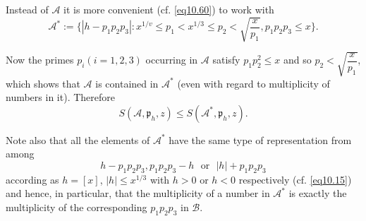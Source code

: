 Instead of $\mathscr{A}$ it is more convenient (cf. \eqref{eq10.60})
to work with 
\begin{equation*}
\mathscr{A}^* := \{ |h-p_1 p_2 p_3 |: x^{1/v} \leq p_1 < x^{1/3} \leq
p_2 < \sqrt{\frac{x}{p_1}}, p_1 p_2 p_3 \leq x
\}. \tag{10.32}\label{eq10.32} 
\end{equation*}

Now the primes $p_i (i = 1,2,3)$ occurring in $\mathscr{A}$ satisfy
$p_1 p^2_2 \leq x$ and so $p_2 < \sqrt{\dfrac{x}{p_1}}$, which shows
that $\mathscr{A}$ is contained in $\mathscr{A}^*$ (even with regard to
multiplicity of numbers in it). Therefore  
\begin{equation*}
S(\mathscr{A}, \mathfrak{p}_h , z) \leq S(\mathscr{A}^*, \mathfrak{p}_h
, z).\tag{10.33}\label{eq10.33}  
\end{equation*}

Note also that all the elements  of $\mathscr{A}^*$ have the same type
of representation from among\pageoriginale 
\begin{equation*}
h- p_1 p_2 p_3, p_1 p_2 p_3 -h \text{~ or~ } |h|+ p_1 p_2 p_3
\tag{10.34}\label{eq10.34} 
\end{equation*} 
according as $h =[x]$, $|h|\leq x^{1/3}$ with $h>0$ or $h<0$
respectively (cf. \eqref{eq10.15}) and hence, in particular, that the
multiplicity of a number in $\mathscr{A}^*$ is exactly the multiplicity
of the corresponding $p_1 p_2 p_3 $ in $\mathscr{B}$. 
 
